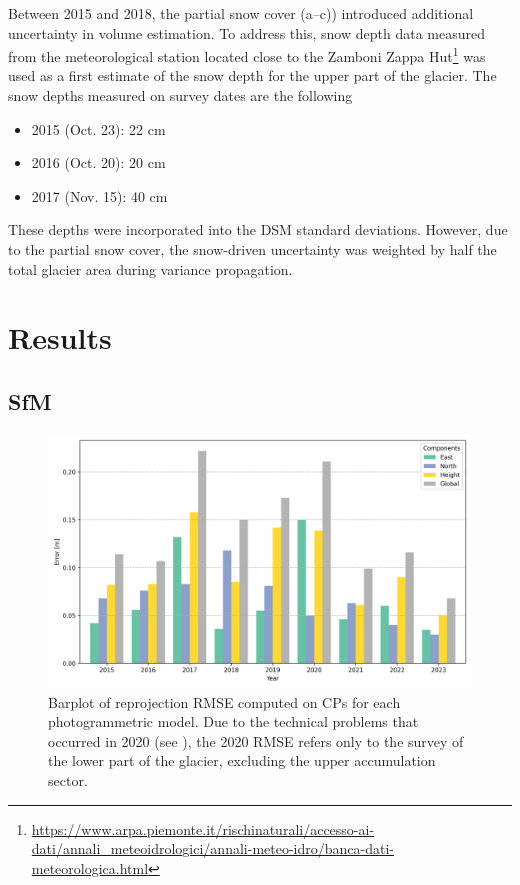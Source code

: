 Between 2015 and 2018, the partial snow cover (a--c)) introduced
additional uncertainty in volume estimation. 
To address this, snow depth data measured from the meteorological station located close 
to the Zamboni Zappa 
Hut\footnote{\mbox{\url{https://www.arpa.piemonte.it/rischinaturali/accesso-ai-dati/annali_meteoidrologici/annali-meteo-idro/banca-dati-meteorologica.html}}} 
was used as a first estimate of the snow depth for the upper part of the glacier. 
The snow depths measured on survey dates are the following
\begin{itemize}
    \item 2015 (Oct. 23): 22 cm
    \item 2016 (Oct. 20): 20 cm
    \item 2017 (Nov. 15): 40 cm
\end{itemize}
These depths were incorporated into the DSM standard deviations. 
However, due to the partial snow cover, the snow-driven uncertainty was weighted 
by half the total glacier area during variance propagation.

\section{Results}\label{sec:3:res}

\subsection{SfM}\label{sec:3:res:sfm}

\begin{figure}[ht!]
    \centering
    \includegraphics[width=0.9\columnwidth]{uav_cp_error.png}
    \caption{Barplot of reprojection RMSE computed on CPs for each photogrammetric
        model. Due to the technical problems that occurred in 2020 
        (see ), the 2020 RMSE refers only to the survey of
        the lower part of the glacier, excluding the upper accumulation sector.
    }
    \label{fig:3:CP_errors}
\end{figure}

